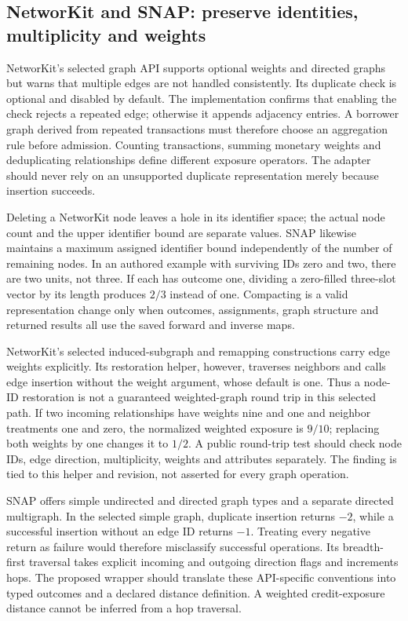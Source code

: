 \subsection{NetworKit and SNAP: preserve identities, multiplicity and weights}

NetworKit's selected graph API supports optional weights and directed graphs but warns that multiple edges are not handled consistently. Its duplicate check is optional and disabled by default. The implementation confirms that enabling the check rejects a repeated edge; otherwise it appends adjacency entries. A borrower graph derived from repeated transactions must therefore choose an aggregation rule before admission. Counting transactions, summing monetary weights and deduplicating relationships define different exposure operators. The adapter should never rely on an unsupported duplicate representation merely because insertion succeeds.~\citep{exec25_cnet_networkit}

Deleting a NetworKit node leaves a hole in its identifier space; the actual node count and the upper identifier bound are separate values. SNAP likewise maintains a maximum assigned identifier bound independently of the number of remaining nodes. In an authored example with surviving IDs zero and two, there are two units, not three. If each has outcome one, dividing a zero-filled three-slot vector by its length produces $2/3$ instead of one. Compacting is a valid representation change only when outcomes, assignments, graph structure and returned results all use the saved forward and inverse maps.~\citep{exec25_cnet_networkit,exec25_cnet_snap,exec25_cnet_choice}

NetworKit's selected induced-subgraph and remapping constructions carry edge weights explicitly. Its restoration helper, however, traverses neighbors and calls edge insertion without the weight argument, whose default is one. Thus a node-ID restoration is not a guaranteed weighted-graph round trip in this selected path. If two incoming relationships have weights nine and one and neighbor treatments one and zero, the normalized weighted exposure is $9/10$; replacing both weights by one changes it to $1/2$. A public round-trip test should check node IDs, edge direction, multiplicity, weights and attributes separately. The finding is tied to this helper and revision, not asserted for every graph operation.~\citep{exec25_cnet_networkit,exec25_cnet_choice}

SNAP offers simple undirected and directed graph types and a separate directed multigraph. In the selected simple graph, duplicate insertion returns $-2$, while a successful insertion without an edge ID returns $-1$. Treating every negative return as failure would therefore misclassify successful operations. Its breadth-first traversal takes explicit incoming and outgoing direction flags and increments hops. The proposed wrapper should translate these API-specific conventions into typed outcomes and a declared distance definition. A weighted credit-exposure distance cannot be inferred from a hop traversal.~\citep{exec25_cnet_snap}

